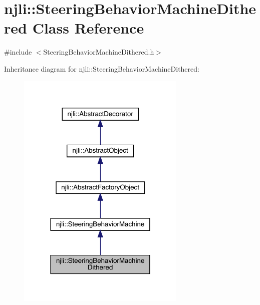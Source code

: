 \hypertarget{classnjli_1_1_steering_behavior_machine_dithered}{}\section{njli\+:\+:Steering\+Behavior\+Machine\+Dithered Class Reference}
\label{classnjli_1_1_steering_behavior_machine_dithered}


{\ttfamily \#include $<$Steering\+Behavior\+Machine\+Dithered.\+h$>$}



Inheritance diagram for njli\+:\+:Steering\+Behavior\+Machine\+Dithered\+:\nopagebreak
\begin{figure}[H]
\begin{center}
\leavevmode
\includegraphics[width=228pt]{classnjli_1_1_steering_behavior_machine_dithered__inherit__graph}
\end{center}
\end{figure}


